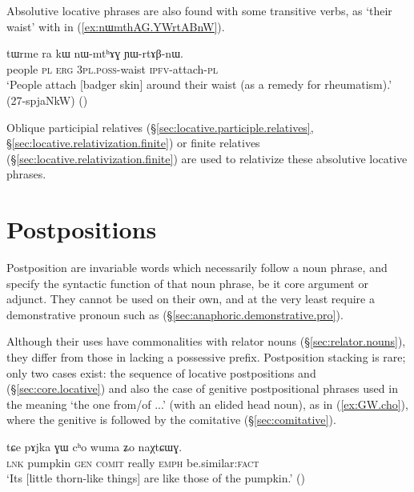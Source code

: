 Absolutive locative phrases are also found with some transitive verbs, as  `their waist' with  in (\ref{ex:nɯmthAG.YWrtABnW}). 

\begin{exe}
\ex \label{ex:nɯmthAG.YWrtABnW}
 \gll tɯrme ra kɯ nɯ-mtʰɤɣ ɲɯ-rtɤβ-nɯ. \\
 people \textsc{pl} \textsc{erg} \textsc{3pl}.\textsc{poss}-waist \textsc{ipfv}-attach-\textsc{pl} \\
 \glt `People attach [badger skin] around their waist (as a remedy for rheumatism).' (27-spjaNkW)
()
\end{exe}

Oblique participial relatives (§\ref{sec:locative.participle.relatives}, §\ref{sec:locative.relativization.finite}) or finite relatives (§\ref{sec:locative.relativization.finite}) are used to relativize these absolutive locative phrases.

\section{Postpositions} \label{ex:postpositions}
Postposition are invariable words which necessarily follow a noun phrase, and specify the syntactic function of that noun phrase, be it core argument or adjunct. They cannot be used on their own, and at the very least require a demonstrative pronoun such as  (§\ref{sec:anaphoric.demonstrative.pro}). 

Although their uses have commonalities with relator nouns (§\ref{sec:relator.nouns}), they differ from those in lacking a possessive prefix. Postposition stacking is rare; only two cases exist: the sequence of locative postpositions  and  (§\ref{sec:core.locative}) and also the case of genitive postpositional phrases used in the meaning `the one from/of ...' (with an elided head noun), as in (\ref{ex:GW.cho}), where the genitive  is followed by the comitative (§\ref{sec:comitative}). 

\begin{exe}
\ex \label{ex:GW.cho}
 \gll tɕe pɤjka ɣɯ cʰo wuma ʑo naχtɕɯɣ. \\
 \textsc{lnk} pumpkin \textsc{gen} \textsc{comit} really \textsc{emph} be.similar:\textsc{fact} \\
 \glt `Its [little thorn-like things] are like those of the pumpkin.' 
()
 \end{exe}
 
